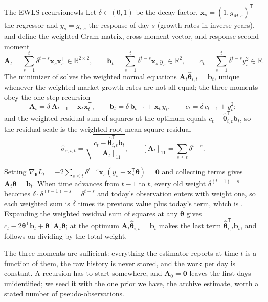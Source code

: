 \documentclass[11pt]{article}
\newcommand{\R}{\mathbb{R}}
\newcommand{\bx}{\mathbf x}
\newcommand{\bA}{\mathbf A}
\newcommand{\bb}{\mathbf b}
\newcommand{\bth}{\boldsymbol\theta}
\begin{document}
\begin{theorem}{The EWLS recursion}{ewls}
Let $\delta\in(0,1)$ be the decay factor, $\bx_s=(1,g_{M,s})^{\mathsf T}$ the regressor and $y_s=g_{i,s}$ the response of day $s$ (growth rates in inverse years), and define the weighted Gram matrix, cross-moment vector, and response second moment
\begin{equation}
  \label{eq:moments}
  \bA_t=\sum_{s=1}^{t}\delta^{t-s}\bx_s\bx_s^{\mathsf T}\in\R^{2\times2},\qquad
  \bb_t=\sum_{s=1}^{t}\delta^{t-s}\bx_s\,y_s\in\R^{2},\qquad
  c_t=\sum_{s=1}^{t}\delta^{t-s}y_s^2\in\R .
\end{equation}
The minimizer of  solves the weighted normal equations $\bA_t\hat{\bth}_{i,t}=\bb_t$, unique whenever the weighted market growth rates are not all equal; the three moments obey the one-step recursion
\begin{equation}
  \label{eq:recursion}
  \bA_t=\delta\,\bA_{t-1}+\bx_t\bx_t^{\mathsf T},\qquad
  \bb_t=\delta\,\bb_{t-1}+\bx_t\,y_t,\qquad
  c_t=\delta\,c_{t-1}+y_t^2 ;
\end{equation}
and the weighted residual sum of squares at the optimum equals $c_t-\hat{\bth}_{i,t}^{\mathsf T}\bb_t$, so the residual scale is the weighted root mean square residual
\begin{equation}
  \label{eq:sigma}
  \hat\sigma_{\varepsilon,i,t}=\sqrt{\frac{c_t-\hat{\bth}_{i,t}^{\mathsf T}\bb_t}{[\bA_t]_{11}}},\qquad [\bA_t]_{11}=\sum_{s\le t}\delta^{t-s}.
\end{equation}
\end{theorem}

\begin{derivation}
Setting $\nabla_{\bth}L_t=-2\sum_{s\le t}\delta^{t-s}\bx_s(y_s-\bx_s^{\mathsf T}\bth)=\mathbf 0$ and collecting terms gives $\bA_t\bth=\bb_t$. When time advances from $t-1$ to $t$, every old weight $\delta^{(t-1)-s}$ becomes $\delta\cdot\delta^{(t-1)-s}=\delta^{t-s}$ and today's observation enters with weight one, so each weighted sum is $\delta$ times its previous value plus today's term, which is . Expanding the weighted residual sum of squares at any $\bth$ gives $c_t-2\bth^{\mathsf T}\bb_t+\bth^{\mathsf T}\bA_t\bth$; at the optimum $\bA_t\hat{\bth}_{i,t}=\bb_t$ makes the last term $\hat{\bth}_{i,t}^{\mathsf T}\bb_t$, and  follows on dividing by the total weight.
\end{derivation}

The three moments are sufficient: everything the estimator reports at time $t$ is a function of them, the raw history is never stored, and the work per day is constant. A recursion has to start somewhere, and $\bA_0=\mathbf 0$ leaves the first days unidentified; we seed it with the one prior we have, the archive estimate, worth a stated number of pseudo-observations.
\end{document}
